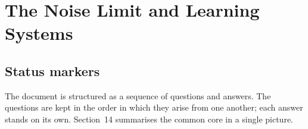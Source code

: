 
\providecommand{\BM}{\textbf{[B]}}
\providecommand{\KM}{\textbf{[K]}}
\providecommand{\SM}{\textbf{[S]}}
\providecommand{\XM}{\textbf{[X]}}
\providecommand{\QM}{\textbf{[Q]}}

\chapter*{The Noise Limit and Learning Systems}

\begin{abstract}
The corpus knows a noise limit: beyond a certain measurement tolerance, harmonic relations can no
longer be distinguished from chance (Doc.~343, Theorem G$'$). In questions and answers, this document
examines whether neural networks and language models run into the same limit, why they nevertheless
almost always produce readable sentences, why language forgives errors and numbers do not, and what
role probability and the weights of a network play. A null test with an exhaustive symbolic search
over about 23 million expressions shows that the dimensionless measured quantities of the basic form
carry no harmonic structure above chance level on their own, and that even a genuine rule such as the
Balmer series becomes visible from a few examples only with the appropriate, narrow prior. The common
core of all answers: discrete structure is error-tolerant, the noise limit sits at the transition from
the discrete to the continuum, and structure that the data do not yield must be specified and then
tested.
\end{abstract}

\section*{Status markers}


\noindent The document is structured as a sequence of questions and answers. The questions are kept
in the order in which they arise from one another; each answer stands on its own. Section~14
summarises the common core in a single picture.

